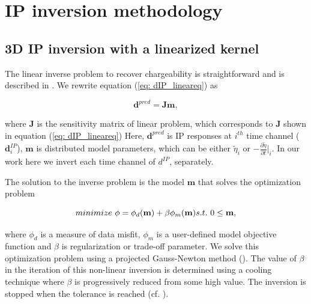 \documentclass[extra,mreferee]{gji}
\newcommand{\peta}{\tilde{\eta}}
\begin{document}
\section{IP inversion methodology}

\subsection{3D IP inversion with a linearized kernel}
The linear inverse problem to recover chargeability is straightforward and is described in \cite{doug1994}. 
We rewrite equation (\ref{eq: dIP_lineareq}) as
\begin{linenomath*}
\begin{equation}
  \mathbf{d}^{pred} = \mathbf{J}\mathbf{m},
  \label{eq9}
\end{equation}
\end{linenomath*}
where $\mathbf{J}$ is the  sensitivity matrix of linear problem, which corresponds to $\mathbf{J}$ shown in equation (\ref{eq: dIP_lineareq}) 
Here, $\mathbf{d}^{pred}$ is IP responses at $i^{th}$ time channel ($\mathbf{d}^{IP}_i$), $\mathbf{m}$ is distributed model parameters, which can be either $\peta_{i}$ or $-\frac{\partial \peta}{\partial t}\big|_i$. 
In our work here we invert each time channel of $d^{IP}$, separately. 

The solution to the inverse problem is the model $\mathbf{m}$ that solves the optimization problem
\begin{linenomath*}
\begin{equation}
  minimize \ \phi =  \phi_d(\mathbf{m}) + \beta\phi_m(\mathbf{m})\nonumber \\
  s.t. \ 0 \le \mathbf{m},
  \label{eq10}
\end{equation}
\end{linenomath*}
where $\phi_d$ is a measure of data misfit, $\phi_m$ is a user-defined model objective function and $\beta$ is regularization or trade-off parameter. We solve this optimization problem using a projected Gauss-Newton method (\cite{Kelley}). 
The value of $\beta$ in the iteration of this non-linear inversion is determined using a cooling technique where $\beta$ is progressively reduced from some high value. The inversion is stopped when the tolerance is reached (cf. \cite{DougTutorial, Kang2014}). 
\end{document}
